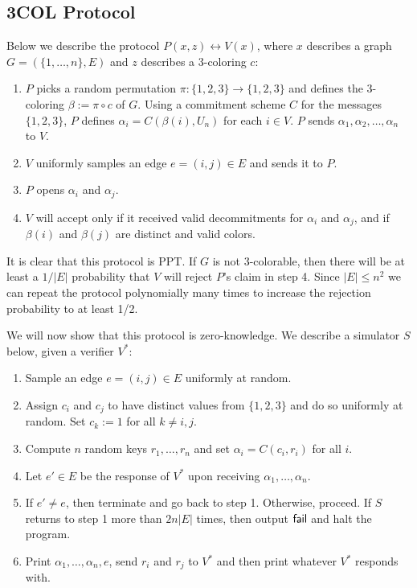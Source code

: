 \documentclass[12pt]{tufte-book}
\begin{document}
\subsection{3COL Protocol}

Below we describe the protocol $P(x,z) \leftrightarrow V(x)$, where $x$ describes a graph $G = (\{1, \ldots, n \}, E)$ and $z$ describes a 3-coloring $c$:

\begin{enumerate}
\item $P$ picks a random permutation $\pi : \{ 1, 2, 3 \} \to \{ 1, 2, 3 \}$ and defines the 3-coloring $\beta := \pi \circ c$ of $G$. Using a commitment scheme $C$ for the messages $\{ 1, 2, 3 \}$, $P$ defines $\alpha_i = C(\beta(i), U_n)$ for each $i \in V$. $P$ sends $\alpha_1, \alpha_2, \ldots, \alpha_n$ to $V$.

\item $V$ uniformly samples an edge $e = (i, j) \in E$ and sends it to $P$.

\item $P$ opens $\alpha_i$ and $\alpha_j$.

\item $V$ will accept only if it received valid decommitments for $\alpha_i$ and $\alpha_j$, and if $\beta(i)$ and $\beta(j)$ are distinct and valid colors.

\end{enumerate}

It is clear that this protocol is PPT. If $G$ is not 3-colorable, then there will be at least a $1/|E|$ probability that $V$ will reject $P$'s claim in step 4. Since $|E| \leq n^2$ we can repeat the protocol polynomially many times to increase the rejection probability to at least 1/2.

We will now show that this protocol is zero-knowledge. We describe a simulator $S$ below, given a verifier $V^*$: \begin{enumerate}
\item Sample an edge $e = (i, j) \in E$ uniformly at random.

\item Assign $c_i$ and $c_j$ to have distinct values from $\{ 1, 2, 3 \}$ and do so uniformly at random. Set $c_k := 1$ for all $k \neq i, j$.

\item Compute $n$ random keys $r_1, \ldots, r_n$ and set $\alpha_i = C(c_i, r_i)$ for all $i$.

\item Let $e' \in E$ be the response of $V^*$ upon receiving $\alpha_1, \ldots, \alpha_n$.

\item If $e' \neq e$, then terminate and go back to step 1. Otherwise, proceed. If $S$ returns to step 1 more than $2n |E|$ times, then output $\sf{fail}$ and halt the program.

\item Print $\alpha_1, \ldots, \alpha_n, e$, send $r_i$ and $r_j$ to $V^*$ and then print whatever $V^*$ responds with.
\end{enumerate}
\end{document}
